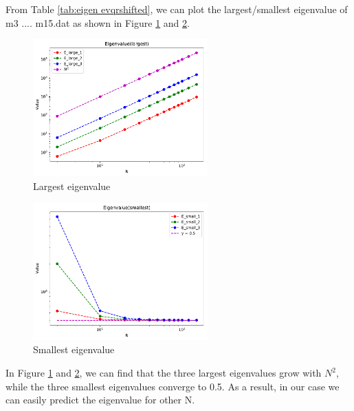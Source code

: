 \documentclass{article}
\begin{document}
From Table \ref{tab:eigen evqrshifted}, we can plot the largest/smallest eigenvalue of m3 .... m15.dat as shown in Figure \ref{fig:eigen largest}
and \ref{fig:eigen smallest}.
\begin{figure}[H]
    \centering
    \includegraphics[width=0.6\textwidth]{src/eigen_largest.pdf}
    \caption{Largest eigenvalue}
    \label{fig:eigen largest}
\end{figure}
\begin{figure}[H]
    \centering
    \includegraphics[width=0.6\textwidth]{src/eigen_smallest.pdf}
    \caption{Smallest eigenvalue}
    \label{fig:eigen smallest}
\end{figure}
In Figure \ref{fig:eigen largest} and \ref{fig:eigen smallest}, we can find that the three largest eigenvalues grow with $N^2$, while the three 
smallest eigenvalues converge to 0.5. As a result, in our case we can easily predict the eigenvalue for other N.
\end{document}

